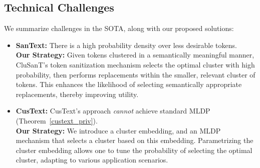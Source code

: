 \documentclass[11pt]{article}
\newcommand{\clusant}{CluSanT\xspace}
\begin{document}
\subsection{Technical Challenges}
We summarize challenges in the SOTA,  along with our proposed solutions:

\begin{itemize}
\setlength\itemsep{0em}
    \item \textbf{SanText:} %
    There is a high probability density over less desirable tokens. \\
    \textbf{Our Strategy:} Given tokens clustered in a semantically meaningful manner, \clusant's token sanitization mechanism selects the optimal cluster with high probability, then performs replacements within the smaller, relevant cluster of tokens. This enhances the likelihood of selecting semantically appropriate replacements, thereby improving utility.

    \item \textbf{CusText:} 
    CusText's approach {\em cannot} achieve standard MLDP (Theorem~\ref{custext_priv}). \\
    \textbf{Our Strategy:} 
    We introduce a cluster embedding, and an MLDP mechanism that selects a cluster based on this embedding. Parametrizing the cluster embedding allows one to tune the probability of selecting the optimal cluster, adapting to various application scenarios.
    

\end{itemize}
\end{document}
